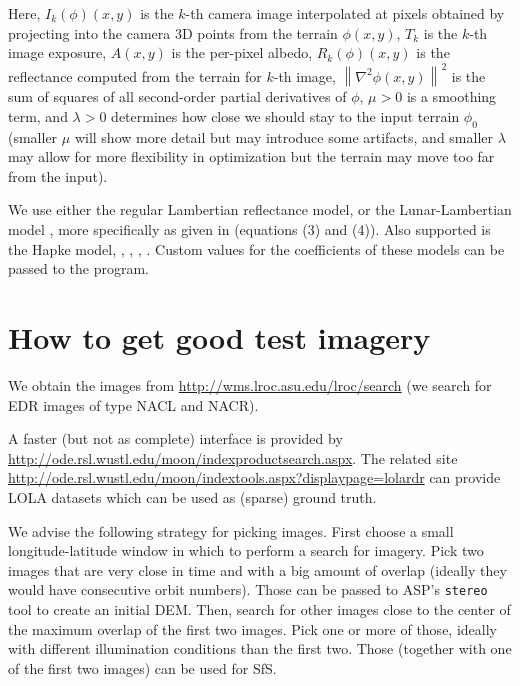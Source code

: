 Here, $I_k(\phi)(x, y)$ is the $k$-th camera image interpolated at
pixels obtained by projecting into the camera 3D points from the terrain
$\phi(x, y)$, $T_k$ is the $k$-th image exposure, $A(x, y)$ is the
per-pixel albedo, $R_k(\phi)(x, y)$ is the reflectance computed from the
terrain for $k$-th image, $\left\|\nabla^2 \phi(x, y) \right\|^2 $ is the sum
of squares of all second-order partial derivatives of $\phi$, $\mu > 0$
is a smoothing term, and $\lambda > 0$ determines how close we should
stay to the input terrain $\phi_0$ (smaller $\mu$ will show more detail
but may introduce some artifacts, and smaller $\lambda$ may allow for
more flexibility in optimization but the terrain may move too far from the input). 

We use either the regular Lambertian reflectance model,
or the Lunar-Lambertian model \cite{mcewen1991photometric}, more specifically as given in
\cite{lohse2006derivation} (equations (3) and (4)).
Also supported is the Hapke model, 
\cite{johnson2006spectrophotometric}, \cite{fernando2013surface},
\cite{hapke2008bidirectional}, \cite{hapke1993opposition}.
Custom values for the coefficients of these models can be passed to the program.

\section{How to get good test imagery}

We obtain the images from
\url{http://wms.lroc.asu.edu/lroc/search} (we search for EDR images of
type NACL and NACR). 

A faster (but not as complete) interface is provided by
\url{http://ode.rsl.wustl.edu/moon/indexproductsearch.aspx}. The related
site
\url{http://ode.rsl.wustl.edu/moon/indextools.aspx?displaypage=lolardr}
can provide LOLA datasets which can be used as (sparse) ground truth.

We advise the following strategy for picking images. First choose a small
longitude-latitude window in which to perform a search for imagery. Pick
two images that are very close in time and with a big amount of overlap
(ideally they would have consecutive orbit numbers).
Those can be passed to ASP's \texttt{stereo} tool to create an initial DEM. Then, search for 
other images close to the center of the maximum overlap of the first
two images. Pick one or more of those, ideally with different illumination
conditions than the first two. Those (together with one of the first two images) can be used for SfS.

